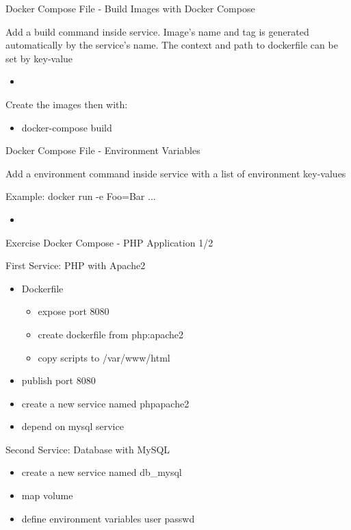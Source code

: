 \documentclass[10pt,aspectratio=\ratio,
compress
]{beamer}
\begin{document}
\begin{frame}{Docker Compose File - Build Images with Docker Compose}

Add a build command inside service.
Image's name and tag is generated automatically by the service's name.
The context and path to dockerfile can be set by key-value
\begin{itemize}
	\item 	%
\end{itemize}

Create the images then with:
\begin{itemize}
	\item docker-compose build
\end{itemize}
\end{frame}

\begin{frame}{Docker Compose File - Environment Variables}

Add a environment command inside service with a list of environment key-values

Example: docker run -e Foo=Bar ...
\begin{itemize}
	\item 	%
\end{itemize}


\end{frame}




\begin{frame}{Exercise Docker Compose - PHP Application 1/2}


First Service: PHP with Apache2
\begin{itemize}
	\item Dockerfile
	\begin{itemize}
			\item expose port 8080
			\item create dockerfile from php:apache2
			\item copy scripts to /var/www/html
	\end{itemize}
	\item publish port 8080
	\item create a new service named phpapache2
	\item depend on mysql service
\end{itemize}
Second Service: Database with MySQL
\begin{itemize}
	\item create a new service named db\_mysql
	\item map volume
	\item define environment variables user passwd
\end{itemize}

\end{frame}
\end{document}
